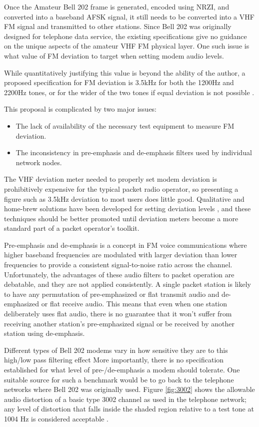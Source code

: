 Once the Amateur Bell 202 frame is generated, encoded using NRZI, and converted into
a baseband AFSK signal, it still needs to be converted into a VHF FM signal
and transmitted to other stations. 
Since Bell 202 was originally designed for telephone data service, 
the existing specifications give no guidance on the unique 
aspects of the amateur VHF FM physical layer. 
One such issue is what value of
FM deviation to target when setting modem audio levels.

While quantitatively justifying this value is beyond the ability of the
author, a proposed specification for FM deviation is 3.5kHz for both the
1200Hz and 2200Hz tones, or for the wider of the two tones if equal
deviation is not possible \cite{millerinterview}.

This proposal is complicated by two major issues: 
\begin{itemize}
	\item The lack of availability of the necessary 
		test equipment to measure FM deviation.
	\item The inconsistency in pre-emphasis and de-emphasis filters
		used by individual network nodes.
\end{itemize}

The VHF deviation meter needed to properly set modem deviation is prohibitively
expensive for the typical packet radio operator, so presenting a figure 
such as 3.5kHz deviation to most users does little good.
Qualitative and home-brew solutions have been developed
for setting deviation levels \cite{n8urdev},
and these techniques should be better promoted until 
deviation meters become a more standard part of a packet operator's toolkit. 

Pre-emphasis and de-emphasis is a concept in FM voice communications where
higher baseband frequencies are modulated with larger deviation 
than lower frequencies
to provide a consistent signal-to-noise ratio across the channel.
Unfortunately, the advantages of these audio filters to packet operation 
are debatable, and they are not applied consistently. A single packet 
station is likely to have any permutation of pre-emphasized or flat 
transmit audio and de-emphasized or flat receive audio.
This means that even when one station deliberately uses flat audio,
there is no guarantee that it won't suffer from receiving another
station's pre-emphasized signal or be received by another station using de-emphasis.

Different types of Bell 202 modems vary in how sensitive they are to this high/low
pass filtering effect More importantly, there is no specification established
for what level of pre-/de-emphasis a modem should tolerate.
One suitable source for such a benchmark would be to go back to the
telephone networks where Bell 202 was originally used.
Figure \ref{fig:3002} shows the allowable audio distortion of a basic type 3002
channel as used in the telephone network; any level of distortion that falls 
inside the shaded region relative to a test tone at 1004 Hz is considered 
acceptable \cite{alisouskas}.

